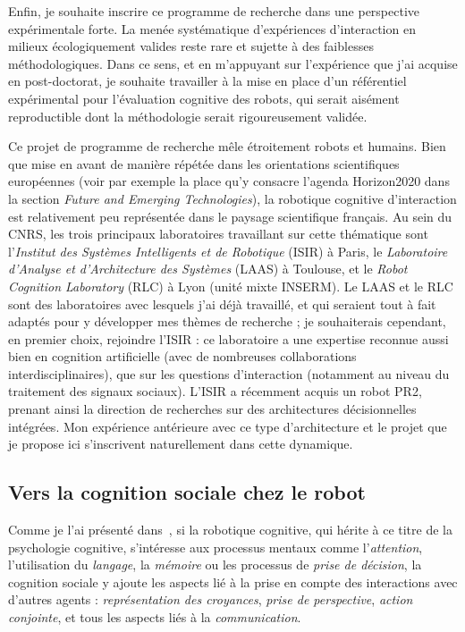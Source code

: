 \documentclass[a4paper]{article}
\begin{document}
Enfin, je souhaite inscrire ce programme de recherche dans une perspective
expérimentale forte. La menée systématique d'expériences d'interaction en
milieux écologiquement valides reste rare et sujette à des faiblesses
méthodologiques. Dans ce sens, et en m'appuyant sur l'expérience que j'ai
acquise en post-doctorat, je souhaite travailler à la mise en place d'un
référentiel expérimental pour l'évaluation cognitive des robots, qui serait
aisément reproductible dont la méthodologie serait rigoureusement validée.

Ce projet de programme de recherche mêle étroitement robots et humains. Bien que
mise en avant de manière répétée dans les orientations scientifiques européennes
(voir par exemple la place qu'y consacre l'agenda Horizon2020 dans la section
\emph{Future and Emerging Technologies}), la robotique cognitive d'interaction
est relativement peu représentée dans le paysage scientifique français. Au sein
du CNRS, les trois principaux laboratoires travaillant sur cette thématique sont
l'\emph{Institut des Systèmes Intelligents et de Robotique} (ISIR) à Paris, le
\emph{Laboratoire d'Analyse et d'Architecture des Systèmes} (LAAS) à Toulouse,
et le \emph{Robot Cognition Laboratory} (RLC) à Lyon (unité mixte INSERM). Le
LAAS et le RLC sont des laboratoires avec lesquels j'ai déjà travaillé, et qui
seraient tout à fait adaptés pour y développer mes thèmes de recherche ; je
souhaiterais cependant, en premier choix, rejoindre l'ISIR : ce laboratoire a
une expertise reconnue aussi bien en cognition artificielle (avec de nombreuses
collaborations interdisciplinaires), que sur les questions d'interaction
(notamment au niveau du traitement des signaux sociaux). L'ISIR a récemment
acquis un robot PR2, prenant ainsi la direction de recherches sur des
architectures décisionnelles intégrées. Mon expérience antérieure avec ce type
d'architecture et le projet que je propose ici s'inscrivent naturellement dans
cette dynamique.

\subsection{Vers la cognition sociale chez le robot}

Comme je l'ai présenté dans~\cite{lemaignan2014human}, si la robotique
cognitive, qui hérite à ce titre de la psychologie cognitive, s'intéresse aux
processus mentaux comme l'\emph{attention}, l'utilisation du \emph{langage}, la
\emph{mémoire} ou les processus de \emph{prise de décision}, la cognition
sociale y ajoute les aspects lié à la prise en compte des interactions avec
d'autres agents : \emph{représentation des croyances}, \emph{prise de
perspective}, \emph{action conjointe}, et tous les aspects liés à la
\emph{communication}.
\end{document}

